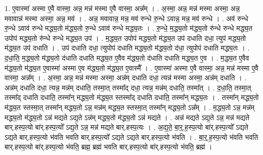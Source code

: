 \documentclass[17pt]{extarticle}
\begin{document}
1. ए॒वास्मा॑ अस्मा ए॒वै वास्मा॒ अन्न॒ मन्न॑ मस्मा ए॒वै वास्मा॒ अन्न᳚म् । . अ॒स्मा॒ अन्न॒ मन्न॑ मस्मा अस्मा॒ अन्न॒ मवावान्न॑ मस्मा अस्मा॒ अन्न॒ मव॑ । . अन्न॒ मवावान्न॒ मन्न॒ मव॑ रुन्धे रु॒न्धे ऽवान्न॒ मन्न॒ मव॑ रुन्धे । . अव॑ रुन्धे रु॒न्धे ऽवाव॑ रुन्धे मद्ध्य॒तो म॑द्ध्य॒तो रु॒न्धे ऽवाव॑ रुन्धे मद्ध्य॒तः । . रु॒न्धे॒ म॒द्ध्य॒तो म॑द्ध्य॒तो रु॑न्धे रुन्धे मद्ध्य॒त उपोप॑ मद्ध्य॒तो रु॑न्धे रुन्धे मद्ध्य॒त उप॑ । . म॒द्ध्य॒त उपोप॑ मद्ध्य॒तो म॑द्ध्य॒त उप॑ दधाति दधा॒ त्युप॑ मद्ध्य॒तो म॑द्ध्य॒त उप॑ दधाति । . उप॑ दधाति दधा॒ त्युपोप॑ दधाति मद्ध्य॒तो म॑द्ध्य॒तो द॑धा॒ त्युपोप॑ दधाति मद्ध्य॒तः । . द॒धा॒ति॒ म॒द्ध्य॒तो म॑द्ध्य॒तो द॑धाति दधाति मद्ध्य॒त ए॒वैव म॑द्ध्य॒तो द॑धाति दधाति मद्ध्य॒त ए॒व । . म॒द्ध्य॒त ए॒वैव म॑द्ध्य॒तो म॑द्ध्य॒त ए॒वास्मा॑ अस्मा ए॒व म॑द्ध्य॒तो म॑द्ध्य॒त ए॒वास्मै᳚ । . ए॒वास्मा॑ अस्मा ए॒वै वास्मा॒ अन्न॒ मन्न॑ मस्मा ए॒वै वास्मा॒ अन्न᳚म् । . अ॒स्मा॒ अन्न॒ मन्न॑ मस्मा अस्मा॒ अन्न॑म् दधाति दधा॒ त्यन्न॑ मस्मा अस्मा॒ अन्न॑म् दधाति । . अन्न॑म् दधाति दधा॒ त्यन्न॒ मन्न॑म् दधाति॒ तस्मा॒त् तस्मा᳚द् दधा॒ त्यन्न॒ मन्न॑म् दधाति॒ तस्मा᳚त् । . द॒धा॒ति॒ तस्मा॒त् तस्मा᳚द् दधाति दधाति॒ तस्मा᳚न् मद्ध्य॒तो म॑द्ध्य॒त स्तस्मा᳚द् दधाति दधाति॒ तस्मा᳚न् मद्ध्य॒तः । . तस्मा᳚न् मद्ध्य॒तो म॑द्ध्य॒त स्तस्मा॒त् तस्मा᳚न् मद्ध्य॒तो ऽन्न॒ मन्न॑म् मद्ध्य॒त स्तस्मा॒त् तस्मा᳚न् मद्ध्य॒तो ऽन्न᳚म् । . म॒द्ध्य॒तो ऽन्न॒ मन्न॑म् मद्ध्य॒तो म॑द्ध्य॒तो ऽन्न॑ मद्यते ऽद्य॒ते ऽन्न॑म् मद्ध्य॒तो म॑द्ध्य॒तो ऽन्न॑ मद्यते । . अन्न॑ मद्यते ऽद्य॒ते ऽन्न॒ मन्न॑ मद्यते बार्.हस्प॒त्यो बा॑र्.हस्प॒त्यो᳚ ऽद्य॒ते ऽन्न॒ मन्न॑ मद्यते बार्.हस्प॒त्यः । . अ॒द्य॒ते॒ बा॒र्॒.ह॒स्प॒त्यो बा॑र्.हस्प॒त्यो᳚ ऽद्यते ऽद्यते बार्.हस्प॒त्यो भ॑वति भवति बार्.हस्प॒त्यो᳚ ऽद्यते ऽद्यते बार्.हस्प॒त्यो भ॑वति । . बा॒र्॒.ह॒स्प॒त्यो भ॑वति भवति बार्.हस्प॒त्यो बा॑र्.हस्प॒त्यो भ॑वति॒ ब्रह्म॒ ब्रह्म॑ भवति बार्.हस्प॒त्यो बा॑र्.हस्प॒त्यो भ॑वति॒ ब्रह्म॑ । \newline
\end{document}
